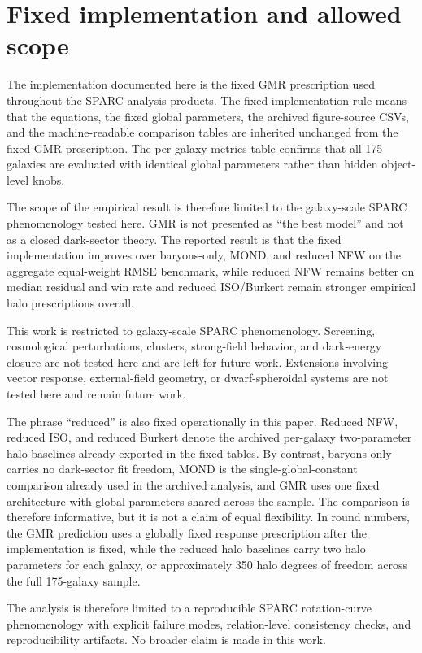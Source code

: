 ﻿\documentclass[twocolumn,linenumbers]{aastex701}
\begin{document}
\section{Fixed implementation and allowed scope}

The implementation documented here is the fixed GMR prescription used throughout the SPARC analysis products. The fixed-implementation rule means that the equations, the fixed global parameters, the archived figure-source CSVs, and the machine-readable comparison tables are inherited unchanged from the fixed GMR prescription. The per-galaxy metrics table confirms that all 175 galaxies are evaluated with identical global parameters rather than hidden object-level knobs.

The scope of the empirical result is therefore limited to the galaxy-scale SPARC phenomenology tested here. GMR is not presented as ``the best model'' and not as a closed dark-sector theory. The reported result is that the fixed implementation improves over baryons-only, MOND, and reduced NFW on the aggregate equal-weight RMSE benchmark, while reduced NFW remains better on median residual and win rate and reduced ISO/Burkert remain stronger empirical halo prescriptions overall.

This work is restricted to galaxy-scale SPARC phenomenology. Screening, cosmological perturbations, clusters, strong-field behavior, and dark-energy closure are not tested here and are left for future work. Extensions involving vector response, external-field geometry, or dwarf-spheroidal systems are not tested here and remain future work.

The phrase ``reduced'' is also fixed operationally in this paper. Reduced NFW, reduced ISO, and reduced Burkert denote the archived per-galaxy two-parameter halo baselines already exported in the fixed tables. By contrast, baryons-only carries no dark-sector fit freedom, MOND is the single-global-constant comparison already used in the archived analysis, and GMR uses one fixed architecture with global parameters shared across the sample. The comparison is therefore informative, but it is not a claim of equal flexibility. In round numbers, the GMR prediction uses a globally fixed response prescription after the implementation is fixed, while the reduced halo baselines carry two halo parameters for each galaxy, or approximately 350 halo degrees of freedom across the full 175-galaxy sample.

The analysis is therefore limited to a reproducible SPARC rotation-curve phenomenology with explicit failure modes, relation-level consistency checks, and reproducibility artifacts. No broader claim is made in this work.
\end{document}
